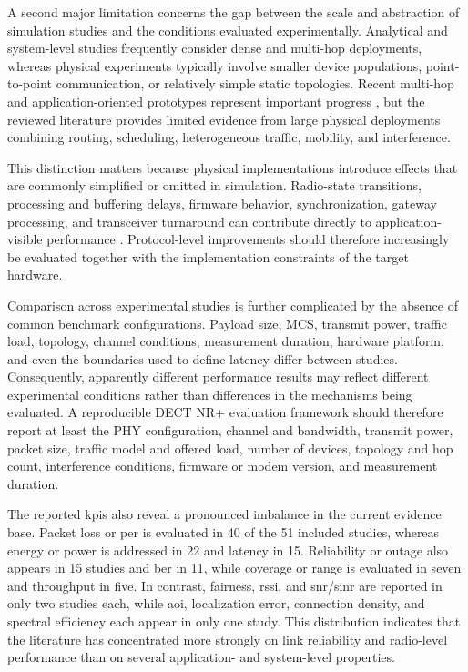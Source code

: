 A second major limitation concerns the gap between the scale and abstraction of simulation studies and the conditions evaluated experimentally. Analytical and system-level studies frequently consider dense and multi-hop deployments, whereas physical experiments typically involve smaller device populations, point-to-point communication, or relatively simple static topologies. Recent multi-hop and application-oriented prototypes represent important progress \cite{piresDECT2020NREnergy2026b, poetsProfessionalNetworkedAudio2025}, but the reviewed literature provides limited evidence from large physical deployments combining routing, scheduling, heterogeneous traffic, mobility, and interference.

This distinction matters because physical implementations introduce effects that are commonly simplified or omitted in simulation. Radio-state transitions, processing and buffering delays, firmware behavior, synchronization, gateway processing, and transceiver turnaround can contribute directly to application-visible performance \cite{bandaraExperimentalValidationAnalysis2025, piresDECT2020NREnergy2026b, alizaiMeasurementDrivenLatencyAnalysis2026}. Protocol-level improvements should therefore increasingly be evaluated together with the implementation constraints of the target hardware.

Comparison across experimental studies is further complicated by the absence of common benchmark configurations. Payload size, MCS, transmit power, traffic load, topology, channel conditions, measurement duration, hardware platform, and even the boundaries used to define latency differ between studies. Consequently, apparently different performance results may reflect different experimental conditions rather than differences in the mechanisms being evaluated. A reproducible DECT NR+ evaluation framework should therefore report at least the PHY configuration, channel and bandwidth, transmit power, packet size, traffic model and offered load, number of devices, topology and hop count, interference conditions, firmware or modem version, and measurement duration.

The reported \glspl{kpi} also reveal a pronounced imbalance in the current evidence base. Packet loss or \gls{per} is evaluated in 40 of the 51 included studies, whereas energy or power is addressed in 22 and latency in 15. Reliability or outage also appears in 15 studies and \gls{ber} in 11, while coverage or range is evaluated in seven and throughput in five. In contrast, fairness, \gls{rssi}, and \gls{snr}/\gls{sinr} are reported in only two studies each, while \gls{aoi}, localization error, connection density, and spectral efficiency each appear in only one study. This distribution indicates that the literature has concentrated more strongly on link reliability and radio-level performance than on several application- and system-level properties.

